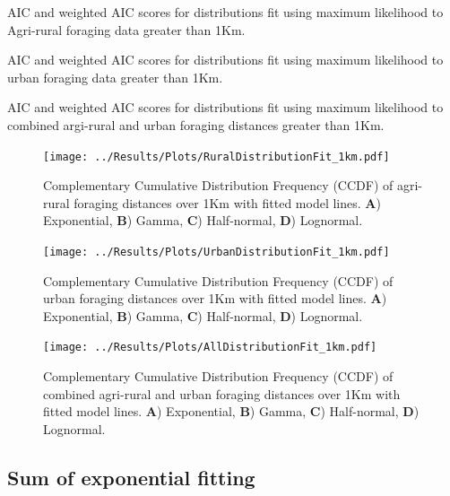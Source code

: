 \documentclass[11pt,usenames,dvipsnames,a4paper]{article}
\begin{document}
\begin{table}[H]
	\centering
	\caption{AIC and weighted AIC scores for distributions fit using maximum likelihood to Agri-rural foraging data greater than 1Km.}
	
\end{table}
\begin{table}[H]
	\centering
	\caption{AIC and weighted AIC scores for distributions fit using maximum likelihood to urban foraging data greater than 1Km.}
	
\end{table}
\begin{table}[H]
	\centering
	\caption{AIC and weighted AIC scores for distributions fit using maximum likelihood to combined argi-rural and urban foraging distances greater than 1Km.}
	
\end{table}

\begin{figure}[H]
	\centering
	\texttt{[image: ../Results/Plots/RuralDistributionFit\_1km.pdf]}
	\caption{Complementary Cumulative Distribution Frequency (CCDF) of agri-rural foraging distances over 1Km with fitted model lines. \textbf{A}) Exponential, \textbf{B}) Gamma, \textbf{C}) Half-normal, \textbf{D}) Lognormal.}
\end{figure}
\begin{figure}[H]
	\centering
	\texttt{[image: ../Results/Plots/UrbanDistributionFit\_1km.pdf]}
	\caption{Complementary Cumulative Distribution Frequency (CCDF) of urban foraging distances over 1Km with fitted model lines. \textbf{A}) Exponential, \textbf{B}) Gamma, \textbf{C}) Half-normal, \textbf{D}) Lognormal.}
\end{figure}
\begin{figure}[H]
	\centering
	\texttt{[image: ../Results/Plots/AllDistributionFit\_1km.pdf]}
	\caption{Complementary Cumulative Distribution Frequency (CCDF) of combined agri-rural and urban foraging distances over 1Km with fitted model lines. \textbf{A}) Exponential, \textbf{B}) Gamma, \textbf{C}) Half-normal, \textbf{D}) Lognormal.}
\end{figure}

\subsection{Sum of exponential fitting}
\end{document}
